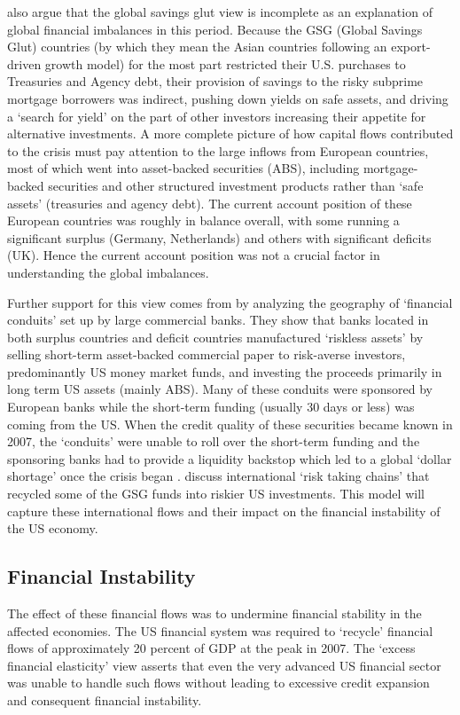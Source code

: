 \documentclass[twoside,a4paper,11pt]{article}
\begin{document}
\cite{Bertaut2012} also argue that the global savings glut view is incomplete as an explanation of global  financial  imbalances in this period. Because the GSG (Global Savings Glut) countries (by which they mean the Asian countries following an export-driven growth model) for the most part restricted their U.S. purchases to Treasuries and Agency debt, their provision of savings to the risky subprime mortgage borrowers was indirect, pushing down yields on safe assets, and driving a `search for yield' on the part of other investors increasing their appetite for alternative investments. A more complete picture of how capital flows contributed to the crisis must pay attention to the large inflows from European countries, most of which went into asset-backed securities (ABS), including mortgage-backed securities and other structured investment products rather than `safe assets' (treasuries and agency debt). The current account position of these European countries was roughly in balance overall, with some running a significant surplus (Germany, Netherlands) and others with significant deficits (UK). Hence the current account position was not a crucial factor in understanding the global imbalances.

Further support for this view comes from \cite{Acharya2010} by analyzing the geography of `financial conduits' set up by large commercial banks. They show that  banks located in both surplus countries and deficit countries manufactured `riskless assets' by selling short-term asset-backed commercial paper to risk-averse investors, predominantly US money market funds, and investing the proceeds primarily in long term US assets (mainly ABS). Many of these conduits were sponsored by European banks while the short-term funding (usually 30 days or less) was coming from the US. When the credit quality of these securities became known in 2007, the `conduits'  were unable to roll over the short-term funding and the sponsoring banks had to provide a liquidity backstop  \cite{Baba2009} which led to a global `dollar shortage' once the crisis began \cite{McGuire2009}. \cite{Brender2010} discuss international `risk taking chains' that recycled some of the GSG funds into riskier US investments. This model will capture these international flows and their impact on the financial instability of the US economy.

\subsection{Financial Instability}
The effect of these financial flows was to undermine financial stability in the affected economies. The US financial system was required to `recycle' financial flows of approximately 20 percent of GDP at the peak in 2007. The `excess financial elasticity' view asserts that even the very advanced US financial sector was unable to handle such flows without leading to excessive credit expansion and consequent financial instability.
\end{document}
